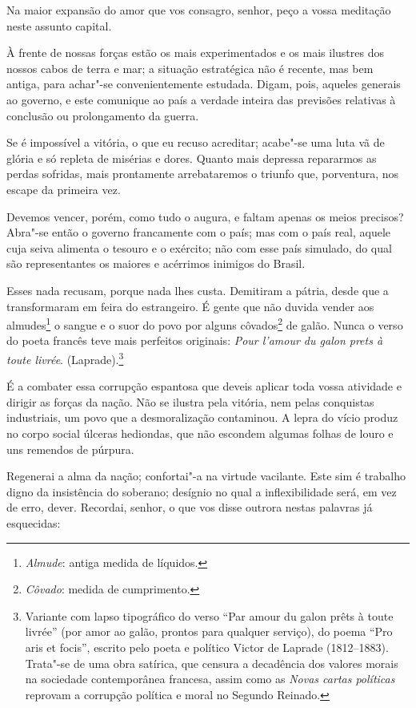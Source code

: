 \sectionitem

Na maior expansão do amor que vos consagro, senhor, peço a vossa
meditação neste assunto capital.

À frente de nossas forças estão os mais experimentados e os mais
ilustres dos nossos cabos de terra e mar; a situação estratégica não é
recente, mas bem antiga, para achar"-se convenientemente estudada.
Digam, pois, aqueles generais ao governo, e este comunique ao país a
verdade inteira das previsões relativas à conclusão ou prolongamento da guerra.

Se é impossível a vitória, o que eu recuso acreditar; acabe"-se uma
luta vã de glória e só repleta de misérias e dores. Quanto mais
depressa repararmos as perdas sofridas, mais prontamente arrebataremos
o triunfo que, porventura, nos escape da primeira vez. 

Devemos vencer, porém, como tudo o augura, e faltam apenas os meios
precisos? Abra"-se então o governo francamente com o país; mas com o
país real, aquele cuja seiva alimenta o tesouro e o exército; não com
esse país simulado, do qual são representantes os maiores e acérrimos
inimigos do Brasil.

Esses nada recusam, porque nada lhes custa. Demitiram a pátria, desde
que a transformaram em feira do \mbox{estrangeiro.} É gente que não duvida
vender aos almudes\footnote{ \textit{Almude}: antiga medida de líquidos.}
 o sangue e o suor do povo por alguns
côvados\footnote{ \textit{Côvado}: medida de cumprimento.}
 de galão. Nunca o verso do poeta francês teve mais perfeitos originais:
\textit{Pour l'amour du galon prets à toute livrée}.
(Laprade).\footnote{ Variante com lapso tipográfico do verso ``Par amour du galon prêts à
toute livrée'' (por amor ao galão, prontos para qualquer serviço), do
poema ``Pro aris et focis'', escrito pelo poeta e político Victor de
Laprade (1812--1883). Trata"-se de uma obra satírica, que censura a
decadência dos valores morais na sociedade contemporânea francesa,
assim como as \textit{Novas cartas políticas} reprovam a corrupção política e
moral no Segundo Reinado.}

É a combater essa corrupção espantosa que deveis aplicar toda vossa
atividade e dirigir as forças da nação. Não se ilustra pela vitória,
nem pelas conquistas industriais, um povo que a desmoralização
contaminou. A lepra do vício produz no corpo social úlceras hediondas,
que não escondem algumas folhas de louro e uns remendos de púrpura. 

Regenerai a alma da nação; confortai"-a na virtude vacilante. Este sim
é trabalho digno da insistência do soberano; desígnio no qual a
inflexibilidade será, em vez de erro, dever. Recordai, senhor, o que
vos disse outrora nestas palavras já esquecidas:

